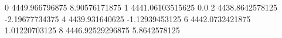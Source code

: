 0 4449.966796875 8.90576171875
1 4441.06103515625 0.0
2 4438.8642578125 -2.19677734375
4 4439.931640625 -1.12939453125
6 4442.0732421875 1.01220703125
8 4446.92529296875 5.8642578125
